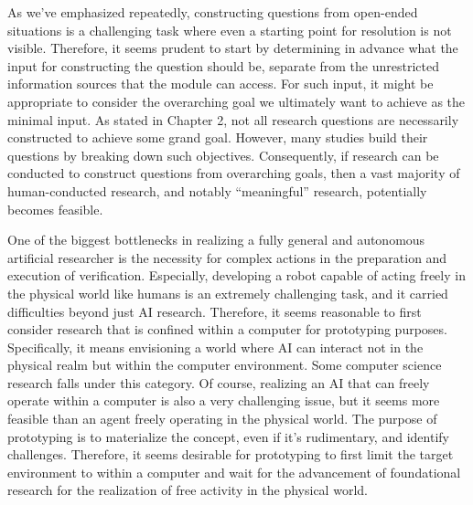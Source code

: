 As we've emphasized repeatedly, constructing questions from open-ended situations is a challenging task where even a starting point for resolution is not visible. Therefore, it seems prudent to start by determining in advance what the input for constructing the question should be, separate from the unrestricted information sources that the module can access. For such input, it might be appropriate to consider the overarching goal we ultimately want to achieve as the minimal input. As stated in Chapter 2, not all research questions are necessarily constructed to achieve some grand goal. However, many studies build their questions by breaking down such objectives. Consequently, if research can be conducted to construct questions from overarching goals, then a vast majority of human-conducted research, and notably ``meaningful'' research, potentially becomes feasible.

One of the biggest bottlenecks in realizing a fully general and autonomous artificial researcher is the necessity for complex actions in the preparation and execution of verification. Especially, developing a robot capable of acting freely in the physical world like humans is an extremely challenging task, and it carried difficulties beyond just AI research. Therefore, it seems reasonable to first consider research that is confined within a computer for prototyping purposes. Specifically, it means envisioning a world where AI can interact not in the physical realm but within the computer environment. Some computer science research falls under this category. Of course, realizing an AI that can freely operate within a computer is also a very challenging issue, but it seems more feasible than an agent freely operating in the physical world. The purpose of prototyping is to materialize the concept, even if it's rudimentary, and identify challenges. Therefore, it seems desirable for prototyping to first limit the target environment to within a computer and wait for the advancement of foundational research for the realization of free activity in the physical world.

